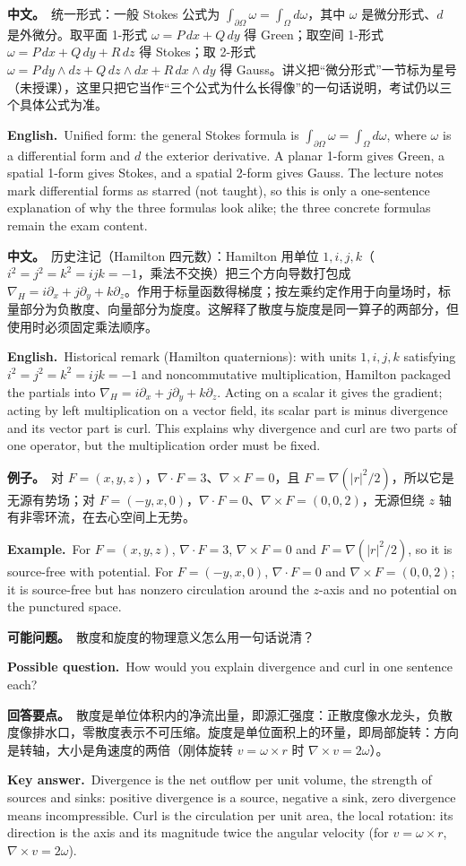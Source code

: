 \documentclass[UTF8,11pt,a4paper]{ctexart}
\newcommand{\BOTH}[2]{\par\noindent\textbf{中文。}\ #1\par\noindent\textbf{English.}\ #2\par}
\newcommand{\EX}[2]{\par\noindent\textbf{例子。}\ #1\par\noindent\textbf{Example.}\ #2\par}
\newcommand{\ASK}[4]{\begin{samepage}\par\noindent\textbf{可能问题。}\ #1\par\noindent\textbf{Possible question.}\ #2\par\noindent\textbf{回答要点。}\ #3\par\noindent\textbf{Key answer.}\ #4\medskip\end{samepage}}
\begin{document}
\BOTH{统一形式：一般 Stokes 公式为 $\int_{\partial\Omega}\omega=\int_\Omega d\omega$，其中 $\omega$ 是微分形式、$d$ 是外微分。取平面 1-形式 $\omega=P\,dx+Q\,dy$ 得 Green；取空间 1-形式 $\omega=P\,dx+Q\,dy+R\,dz$ 得 Stokes；取 2-形式 $\omega=P\,dy\wedge dz+Q\,dz\wedge dx+R\,dx\wedge dy$ 得 Gauss。讲义把“微分形式”一节标为星号（未授课），这里只把它当作“三个公式为什么长得像”的一句话说明，考试仍以三个具体公式为准。}{Unified form: the general Stokes formula is $\int_{\partial\Omega}\omega=\int_\Omega d\omega$, where $\omega$ is a differential form and $d$ the exterior derivative. A planar 1-form gives Green, a spatial 1-form gives Stokes, and a spatial 2-form gives Gauss. The lecture notes mark differential forms as starred (not taught), so this is only a one-sentence explanation of why the three formulas look alike; the three concrete formulas remain the exam content.}
\BOTH{历史注记（Hamilton 四元数）：Hamilton 用单位 $1,i,j,k$（$i^2=j^2=k^2=ijk=-1$，乘法不交换）把三个方向导数打包成 $\nabla_H=i\partial_x+j\partial_y+k\partial_z$。作用于标量函数得梯度；按左乘约定作用于向量场时，标量部分为负散度、向量部分为旋度。这解释了散度与旋度是同一算子的两部分，但使用时必须固定乘法顺序。}{Historical remark (Hamilton quaternions): with units $1,i,j,k$ satisfying $i^2=j^2=k^2=ijk=-1$ and noncommutative multiplication, Hamilton packaged the partials into $\nabla_H=i\partial_x+j\partial_y+k\partial_z$. Acting on a scalar it gives the gradient; acting by left multiplication on a vector field, its scalar part is minus divergence and its vector part is curl. This explains why divergence and curl are two parts of one operator, but the multiplication order must be fixed.}
\EX{对 $F=(x,y,z)$，$\nabla\cdot F=3$、$\nabla\times F=0$，且 $F=\nabla(|r|^2/2)$，所以它是无源有势场；对 $F=(-y,x,0)$，$\nabla\cdot F=0$、$\nabla\times F=(0,0,2)$，无源但绕 $z$ 轴有非零环流，在去心空间上无势。}{For $F=(x,y,z)$, $\nabla\cdot F=3$, $\nabla\times F=0$ and $F=\nabla(|r|^2/2)$, so it is source-free with potential. For $F=(-y,x,0)$, $\nabla\cdot F=0$ and $\nabla\times F=(0,0,2)$; it is source-free but has nonzero circulation around the $z$-axis and no potential on the punctured space.}
\ASK{散度和旋度的物理意义怎么用一句话说清？}{How would you explain divergence and curl in one sentence each?}{散度是单位体积内的净流出量，即源汇强度：正散度像水龙头，负散度像排水口，零散度表示不可压缩。旋度是单位面积上的环量，即局部旋转：方向是转轴，大小是角速度的两倍（刚体旋转 $v=\omega\times r$ 时 $\nabla\times v=2\omega$）。}{Divergence is the net outflow per unit volume, the strength of sources and sinks: positive divergence is a source, negative a sink, zero divergence means incompressible. Curl is the circulation per unit area, the local rotation: its direction is the axis and its magnitude twice the angular velocity (for $v=\omega\times r$, $\nabla\times v=2\omega$).}
\end{document}
